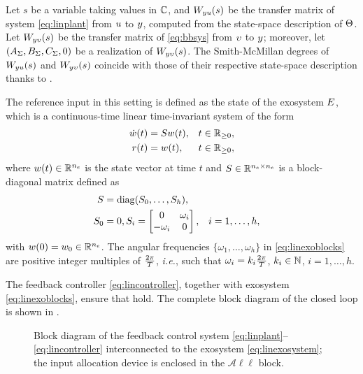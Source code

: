Let $s$ be a variable taking values in $\mathbb{C}$, and $W_{yu}(s)$ be the transfer matrix of system \eqref{eq:linplant} from $u$ to $y$, computed from the state-space description of $\Theta$. Let $W_{y\upsilon}(s)$ be the transfer matrix of \eqref{eq:bbsys} from $\upsilon$ to $y$; moreover, let $(A_\Sigma,B_\Sigma,C_\Sigma,0)$ be a realization of $W_{y\upsilon}(s)$. The Smith-McMillan degrees of $W_{yu}(s)$ and $W_{y\upsilon}(s)$ coincide with those of their respective state-space description thanks to .

The reference input in this setting is defined as the state of the exosystem $E$, which is a continuous-time linear time-invariant system of the form
\begin{subequations}
	\label{eq:linexosystem}
	\begin{align}
		\dot{w}(t) & = Sw(t), & t\in\mathbb{R}_{\geq 0}, \\
		r(t)            & = w(t), & t\in\mathbb{R}_{\geq 0},
	\end{align}
\end{subequations}
where $w(t)\in\mathbb{R}^{{n_e}}$ is the state vector at time $t$ and $S\in\mathbb{R}^{{n_e} \times {n_e}}$ is a block-diagonal matrix defined as
\begin{subequations}
	\label{eq:linexoblocks}
	\begin{align}
    S & = \operatorname{diag}(S_0,\dotsc,S_h), \\
		S_0 & = 0,	S_i = \begin{bmatrix} 0 & \omega_i \\ -\omega_i & 0 \end{bmatrix}, &  & i=1,\dotsc,h,
	\end{align}
\end{subequations}
with $w(0) = w_0\in\mathbb{R}^{{n_e}}$. The angular frequencies $\{\omega_1,\dotsc,\omega_h\}$ in \eqref{eq:linexoblocks} are positive integer multiples of $\frac{2\pi}{T}$, \emph{i.e.}, such that $\omega_i = k_i\frac{2\pi}{T}$, $k_i\in\mathbb{N}$, $i=1,\dotsc,h$.

The feedback controller \eqref{eq:lincontroller}, together with exosystem \eqref{eq:linexoblocks}, ensure that  hold. The complete block diagram of the closed loop is shown in .
\begin{figure}[t!]
  \centering
  
  \caption{Block diagram of the feedback control system \eqref{eq:linplant}--\eqref{eq:lincontroller} interconnected to the exosystem \eqref{eq:linexosystem}; the input allocation device is enclosed in the $\mathcal{A}\ell\ell$ block.}
  \label{fig:lqrall}
\end{figure}

